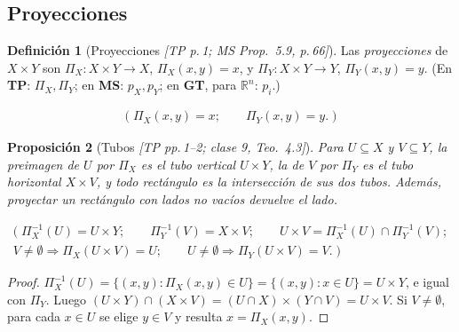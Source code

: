 \documentclass[11pt,a4paper]{article}
\newcommand{\lgc}[1]{\par\vspace{-3pt}\begin{gather*}\big(\;#1\;\big)\end{gather*}\vspace{-6pt}}
\theoremstyle{definition}
\newtheorem{definicion}{Definición}[section]
\theoremstyle{plain}
\newtheorem{proposicion}[definicion]{Proposición}
\newcommand{\fnt}[1]{{\normalfont\small\itshape\color{gray!150!black}[#1]}}
\newcommand{\R}{\mathbb{R}}
\begin{document}
\subsection{Proyecciones}

\begin{definicion}[Proyecciones \fnt{TP p.\,1; MS Prop.\ 5.9, p.\,66}]
Las \emph{proyecciones} de $X\times Y$ son $\Pi_X:X\times Y\to X$, $\Pi_X(x,y)=x$, y $\Pi_Y:X\times Y\to Y$, $\Pi_Y(x,y)=y$. (En \textbf{TP}: $\Pi_X,\Pi_Y$; en \textbf{MS}: $p_X,p_Y$; en \textbf{GT}, para $\R^n$: $p_i$.)
\lgc{\Pi_X(x,y)=x;\qquad \Pi_Y(x,y)=y.}
\end{definicion}

\begin{proposicion}[Tubos \fnt{TP pp.\,1--2; clase 9, Teo.\ 4.3}]\label{pr:tubos}
Para $U\subseteq X$ y $V\subseteq Y$, la preimagen de $U$ por $\Pi_X$ es el tubo vertical $U\times Y$, la de $V$ por $\Pi_Y$ es el tubo horizontal $X\times V$, y todo rectángulo es la intersección de sus dos tubos. Además, proyectar un rectángulo con lados no vacíos devuelve el lado.
\lgc{\Pi_X^{-1}(U)=U\times Y;\qquad \Pi_Y^{-1}(V)=X\times V;\qquad U\times V=\Pi_X^{-1}(U)\cap\Pi_Y^{-1}(V);\\
V\ne\emptyset\Rightarrow \Pi_X(U\times V)=U;\qquad U\ne\emptyset\Rightarrow \Pi_Y(U\times V)=V.}
\end{proposicion}

\begin{proof}
$\Pi_X^{-1}(U)=\{(x,y): \Pi_X(x,y)\in U\}=\{(x,y): x\in U\}=U\times Y$, e igual con $\Pi_Y$. Luego $(U\times Y)\cap(X\times V)=(U\cap X)\times(Y\cap V)=U\times V$. Si $V\ne\emptyset$, para cada $x\in U$ se elige $y\in V$ y resulta $x=\Pi_X(x,y)$.
\end{proof}
\end{document}
